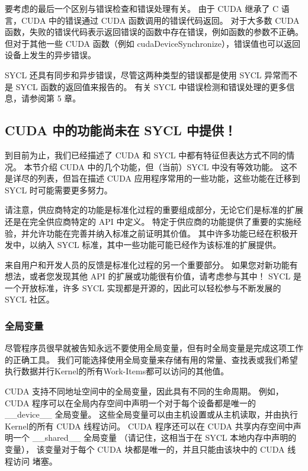 要考虑的最后一个区别与错误检查和错误处理有关。 
由于 CUDA 继承了 C 语言，CUDA 中的错误通过 CUDA 函数调用的错误代码返回。 
对于大多数 CUDA 函数，失败的错误代码表示返回错误的函数中存在错误，例如函数的参数不正确。 
但对于其他一些 CUDA 函数（例如 cudaDeviceSynchronize），错误值也可以返回设备上发生的异步错误。

SYCL 还具有同步和异步错误，尽管这两种类型的错误都是使用 SYCL 异常而不是 SYCL 函数的返回值来报告的。 
有关 SYCL 中错误检测和错误处理的更多信息，请参阅第 5 章。

\subsection{CUDA 中的功能尚未在 SYCL 中提供！}
到目前为止，我们已经描述了 CUDA 和 SYCL 中都有特征但表达方式不同的情况。 
本节介绍 CUDA 中的几个功能，但（当前）SYCL 中没有等效功能。 
这不是详尽的列表，但旨在描述 CUDA 应用程序常用的一些功能，这些功能在迁移到 SYCL 时可能需要更多努力。

请注意，供应商特定的功能是标准化过程的重要组成部分，无论它们是标准的扩展还是在完全供应商特定的 API 中定义。 
特定于供应商的功能提供了重要的实施经验，并允许功能在完善并纳入标准之前证明其价值。 
其中许多功能已经在积极开发中，以纳入 SYCL 标准，其中一些功能可能已经作为该标准的扩展提供。

\begin{remark}[参与进来！]
来自用户和开发人员的反馈是标准化过程的另一个重要部分。
如果您对新功能有想法，或者您发现其他 API 的扩展或功能很有价值，请考虑参与其中！
SYCL 是一个开放标准，许多 SYCL 实现都是开源的，因此可以轻松参与不断发展的 SYCL 社区。
\end{remark}

\subsubsection{全局变量}
尽管程序员很早就被告知永远不要使用全局变量，但有时全局变量是完成这项工作的正确工具。 
我们可能选择使用全局变量来存储有用的常量、查找表或我们希望执行数据并行Kernel的所有Work-Items都可以访问的其他值。

CUDA 支持不同地址空间中的全局变量，因此具有不同的生命周期。 
例如，CUDA 程序可以在全局内存空间中声明一个对于每个设备都是唯一的 \_\_device\_\_ 全局变量。 
这些全局变量可以由主机设置或从主机读取，并由执行Kernel的所有 CUDA 线程访问。 
CUDA 程序还可以在 CUDA 共享内存空间中声明一个 \_\_shared\_\_ 全局变量
（请记住，这相当于在 SYCL 本地内存中声明的变量），
该变量对于每个 CUDA 块都是唯一的，并且只能由该块中的 CUDA 线程访问 堵塞。

